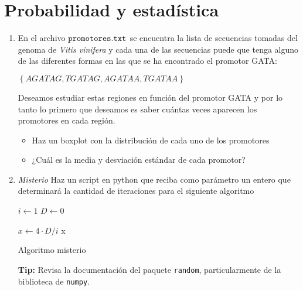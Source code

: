 \documentclass[letter]{article}
\begin{document}
    \section{Probabilidad y estadística}

    \begin{enumerate}

        \item En el archivo ${\tt{promotores.txt}}$ se encuentra 
    		la lista de secuencias tomadas del genoma de {\it{Vitis vinifera}}
    		y cada una de las secuencias puede que tenga alguno de las 
    		diferentes formas en las que se ha encontrado el promotor GATA:
    
    		$\left \lbrace AGATAG, TGATAG, AGATAA, TGATAA  \right \rbrace$
    
    		Deseamos estudiar estas regiones en función del promotor GATA y 
    		por lo tanto lo primero que deseamos es saber cuántas veces aparecen 
    		los promotores en cada región.\\

            \begin{itemize}
                \item Haz un boxplot con la distribución de cada uno 
                de los promotores 

                \item ¿Cuál es la media y desviación estándar de cada
                promotor?
                
            \end{itemize}
    
        \item {\it Misterio} Haz un script en python que reciba como parámetro un entero 
        	que determinará la cantidad de iteraciones para el siguiente 
        	algoritmo
        
        	\begin{algorithm}[H]
        		$i \leftarrow 1$\;
        		$D \leftarrow 0$\;
        
        		$x \leftarrow 4 \cdot D/i$\;
        		\Return x\;
        		\caption{Algoritmo misterio}
        		\label{alg:misterio}
        	\end{algorithm}
        	{\bf{Tip}:} Revisa la documentación del paquete {\tt random}, particularmente
        	de la biblioteca de {\tt numpy}.
        

\end{enumerate}
\end{document}
